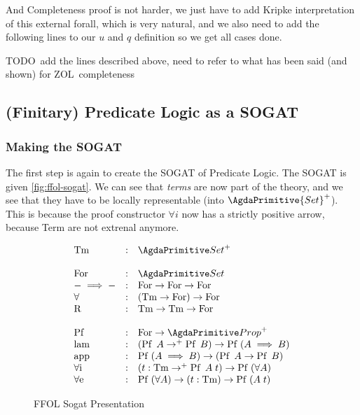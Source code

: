 \documentclass[10pt,a4paper]{article}
\begin{document}
			\begin{tcolorbox}
				\agdasep
			\end{tcolorbox}
			
			And Completeness proof is not harder, we just have to add Kripke interpretation of this external forall, which is very natural, and we also need to add the following lines to our $u$ and $q$ definition so we get all cases done.
			
			\begin{tcolorbox}
				TODO add the lines described above, need to refer to what has been said (and shown) for ZOL completeness
			\end{tcolorbox}
		
		\subsection{(Finitary) Predicate Logic as a SOGAT}
		
		\subsubsection{Making the SOGAT}
		
			The first step is again to create the SOGAT of Predicate Logic. The SOGAT is given \autoref{fig:ffol-sogat}. We can see that \emph{terms} are now part of the theory, and we see that they have to be locally representable (into $\AgdaPrimitive{Set}^+$). This is because the proof constructor $\forall i$ now has a strictly positive arrow, because Term are not extrenal anymore.
		
			\begin{figure}
			\begin{tcolorbox}
				\[
				\begin{array}{lcl}
					\Tm & : & \Set^+ \\
					\\
					\For & : & \Set \\
					- \implies - & : & \For \rightarrow \For \rightarrow \For\\
					\forall & : & (\Tm \rightarrow \For) \rightarrow \For \\
					\R & : & \Tm \rightarrow \Tm \rightarrow \For\\
					\\
					\Pf & : & \For \rightarrow \Prop^+ \\
					\lam & : & (\Pf A \rightarrow^+ \Pf B) \rightarrow \Pf (A \implies B)\\
					\app & : & \Pf (A \implies B) \rightarrow (\Pf A \rightarrow \Pf B)\\
					\foralli & : & (t : \Tm \rightarrow^+ \Pf A\;t) \rightarrow \Pf (\forall A)\\
					\foralle & : & \Pf (\forall A) \rightarrow (t : \Tm) \rightarrow \Pf (A\;t)\\
				\end{array}
				\]
			\end{tcolorbox}
			\caption{FFOL Sogat Presentation}
			\label{fig:ffol-sogat}
			\end{figure}
			
\end{document}

